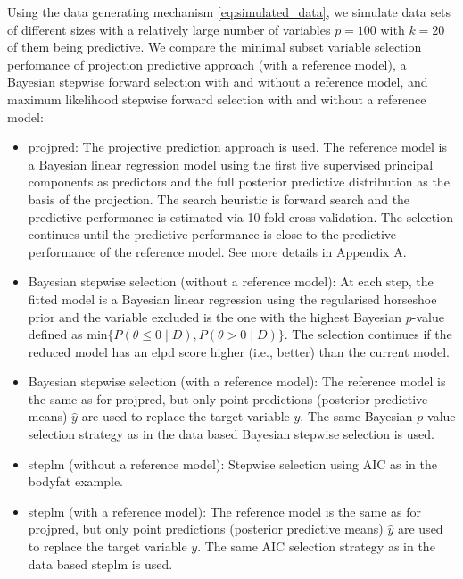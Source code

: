 \documentclass[a4]{article}
\theoremstyle{definition}
\begin{document}
Using the data generating mechanism \eqref{eq:simulated_data}, we
simulate data sets of different sizes with a relatively large number
of variables $p=100$ with $k=20$ of them being predictive.  We compare
the minimal subset variable selection perfomance of projection
predictive approach (with a reference model), a Bayesian stepwise
forward selection with and without a reference model, and maximum
likelihood stepwise forward selection with and without a reference
model:
\begin{itemize}
\item projpred: The projective prediction approach is used. 
  The reference model is a Bayesian linear regression
  model using the first five supervised principal components \citep{piironen2018} as predictors
  and the full posterior predictive distribution as the basis of the projection.   
  The search heuristic  is forward search and the predictive performance 
  is estimated via 10-fold cross-validation. The selection continues
  until the predictive performance is close to the predictive
  performance of the reference model. See more details in Appendix A.
  
\item Bayesian stepwise selection (without a reference model): At each step, the fitted model
 is a Bayesian linear regression using the regularised horseshoe
  prior and the variable excluded is the one with the highest Bayesian
  $p$-value defined as $\text{min}\{P(\theta\leq0 \; | \; D),P(\theta>0 \; | \; D)\}$.
The selection continues if the reduced model has an elpd score higher 
(i.e., better) than the current model.

\item Bayesian stepwise selection (with a reference model): The reference model is the same as for projpred, but only point predictions (posterior predictive means) $\hat{y}$ are used to replace the target variable $y$. The same Bayesian
  $p$-value selection strategy as in the data based Bayesian stepwise selection is used.

\item steplm (without a reference model): Stepwise selection using AIC as in the bodyfat example.

\item steplm (with a reference model): The reference model is the same as for
 projpred, but only point predictions (posterior predictive means) $\hat{y}$ 
 are used to replace the target variable $y$. The same AIC selection strategy 
 as in the data based steplm is used.

\end{itemize}
\end{document}
